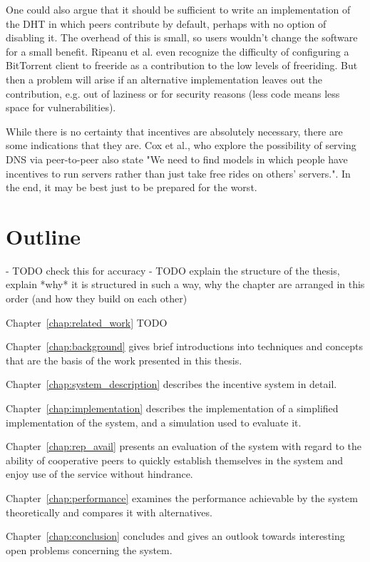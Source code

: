 One could also argue that it should be sufficient to write an implementation of
the \ac{DHT} in which peers contribute by default, perhaps with no option of
disabling it. The overhead of this is small, so users wouldn't change the
software for a small benefit. Ripeanu et al.\cite{ripeanu2006gifting} even
recognize the difficulty of configuring a BitTorrent client to freeride as a
contribution to the low levels of freeriding. But then a problem will arise if
an alternative implementation leaves out the contribution, e.g. out of laziness
or for security reasons (less code means less space for vulnerabilities).

While there is no certainty that incentives are absolutely necessary, there are
some indications that they are. Cox et al.\cite{cox2002serving}, who explore the
possibility of serving DNS via peer-to-peer also state "We need to find models
in which people have incentives to run servers rather than just take free rides
on others’ servers.". In the end, it may be best just to be prepared for the
worst.

\section{Outline}
- TODO check this for accuracy
- TODO explain the structure of the thesis, explain *why* it is structured in
  such a way, why the chapter are arranged in this order (and how they build on
  each other)

Chapter~\ref{chap:related_work} TODO

Chapter~\ref{chap:background} gives brief introductions into techniques and
concepts that are the basis of the work presented in this thesis.

Chapter~\ref{chap:system_description} describes the incentive system in detail.

Chapter~\ref{chap:implementation} describes the implementation of a simplified
implementation of the system, and a simulation used to evaluate it.

Chapter~\ref{chap:rep_avail} presents an evaluation of the system with regard to
the ability of cooperative peers to quickly establish themselves in the system
and enjoy use of the service without hindrance.

Chapter~\ref{chap:performance} examines the performance achievable by the system
theoretically and compares it with alternatives.

Chapter~\ref{chap:conclusion} concludes and gives an outlook towards interesting
open problems concerning the system.
